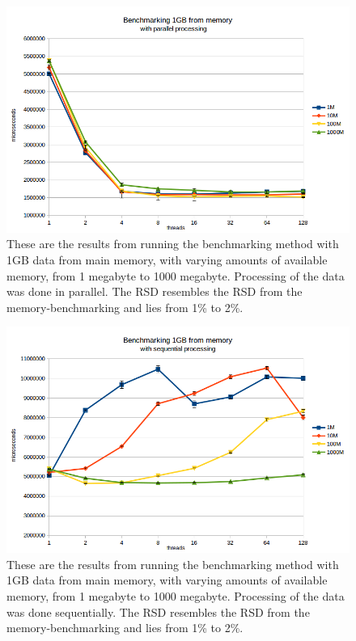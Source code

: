 \documentclass[a4paper]{article}
\begin{document}
\begin{figure}
	\begin{adjustwidth}{-0.5in}{-0.5in}
    \centering
     \includegraphics[scale=0.7]{figures/mem_par.png}
  	\caption{These are the results from running the benchmarking method with 1GB data from main memory, with varying amounts of available memory, from 1 megabyte to 1000 megabyte. Processing of the data was done in parallel. The RSD resembles the RSD from the memory-benchmarking and lies from 1\% to 2\%.}
	\label{figure:mem-par}
	\end{adjustwidth}
\end{figure}

\begin{figure}
	\begin{adjustwidth}{-0.5in}{-0.5in}
    \centering
     \includegraphics[scale=0.7]{figures/mem_seq.png}
  	\caption{These are the results from running the benchmarking method with 1GB data from main memory, with varying amounts of available memory, from 1 megabyte to 1000 megabyte. Processing of the data was done sequentially. The RSD resembles the RSD from the memory-benchmarking and lies from 1\% to 2\%.}
	\label{figure:mem-seq}
	\end{adjustwidth}
\end{figure}
\end{document}
